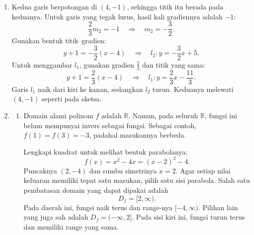 \documentclass[10pt,letterpaper]{article}
\newcommand{\R}{\mathbb{R}}
\begin{document}
\begin{enumerate}
  \item Kedua garis berpotongan di $(4,-1)$, sehingga titik itu berada pada keduanya.
        Untuk garis yang tegak lurus, hasil kali gradiennya adalah $-1$:
        \[
          \frac23m_2=-1\quad\Longrightarrow\quad m_2=-\frac32.
        \]
        Gunakan bentuk titik--gradien:
        \[
          y+1=-\frac32(x-4)
          \quad\Longrightarrow\quad\boxed{l_2:y=-\frac32x+5}.
        \]
        Untuk menggambar $l_1$, gunakan gradien $\frac23$ dan titik yang sama:
        \[
          y+1=\frac23(x-4)
          \quad\Longrightarrow\quad l_1:y=\frac23x-\frac{11}{3}.
        \]
        Garis $l_1$ naik dari kiri ke kanan, sedangkan $l_2$ turun.
        Keduanya melewati $(4,-1)$ seperti pada sketsa.
        \begin{center}
        \end{center}

        \newpage

  \item \begin{enumerate}
          \item Domain alami polinom $f$ adalah $\R$.
                Namun, pada seluruh $\R$, fungsi ini belum mempunyai invers sebagai fungsi.
                Sebagai contoh, $f(1)=f(3)=-3$, padahal masukannya berbeda.

                Lengkapi kuadrat untuk melihat bentuk parabolanya:
                \[
                  f(x)=x^2-4x=(x-2)^2-4.
                \]
                Puncaknya $(2,-4)$ dan sumbu simetrinya $x=2$.
                Agar setiap nilai keluaran memiliki tepat satu masukan, pilih satu sisi parabola.
                Salah satu pembatasan domain yang dapat dipakai adalah
                \[
                  \boxed{D_f=[2,\infty)}.
                \]
                Pada daerah ini, fungsi naik terus dan range-nya $[-4,\infty)$.
                Pilihan lain yang juga sah adalah $D_f=(-\infty,2]$.
                Pada sisi kiri ini, fungsi turun terus dan memiliki range yang sama.


\end{enumerate}
\end{enumerate}
\end{document}
